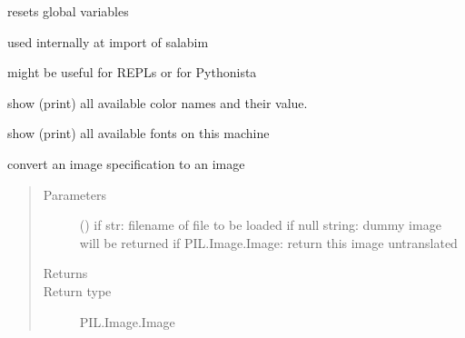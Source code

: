 \documentclass[letterpaper,10pt,english]{sphinxmanual}
\begin{document}

\begin{fulllineitems}
\label{\detokenize{Reference:salabim.reset}}
resets global variables

used internally at import of salabim

might be useful for REPLs or for Pythonista

\end{fulllineitems}


\begin{fulllineitems}
\label{\detokenize{Reference:salabim.show_colornames}}
show (print) all available color names and their value.

\end{fulllineitems}


\begin{fulllineitems}
\label{\detokenize{Reference:salabim.show_fonts}}
show (print) all available fonts on this machine

\end{fulllineitems}


\begin{fulllineitems}
\label{\detokenize{Reference:salabim.spec_to_image}}
convert an image specification to an image
\begin{quote}\begin{description}
\item[{Parameters}] \leavevmode
{} () \textendash{} if str: filename of file to be loaded 
if null string: dummy image will be returned 
if PIL.Image.Image: return this image untranslated

\item[{Returns}] \leavevmode
{}

\item[{Return type}] \leavevmode
PIL.Image.Image

\end{description}\end{quote}

\end{fulllineitems}
\end{document}
